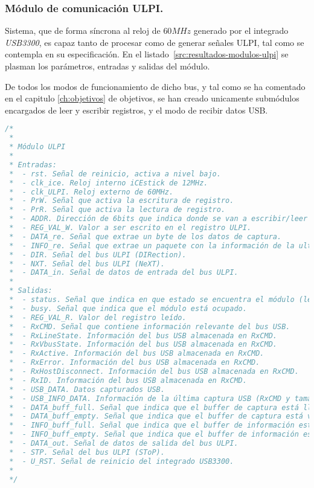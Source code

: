 \subsubsection{Módulo de comunicación ULPI.}
Sistema, que de forma síncrona al reloj de $60MHz$ generado por el integrado \emph{USB3300}, es capaz tanto de procesar como de generar señales ULPI, tal como se contempla en su especificación\cite{ulpi-specs}. En el listado~\ref{src:resultados-modulos-ulpi} se plasman los parámetros, entradas y salidas del módulo.

De todos los modos de funcionamiento de dicho bus, y tal como se ha comentado en el capitulo \ref{ch:objetivos} de objetivos, se han creado unicamente submódulos encargados de leer y escribir registros, y el modo de recibir datos USB.

\begin{lstlisting}[language=Verilog,
    caption={Entradas y salidas del módulo ULPI.},
    label=src:resultados-modulos-ulpi]
/*
 *
 * Módulo ULPI
 *
 * Entradas:
 *  - rst. Señal de reinicio, activa a nivel bajo.
 *  - clk_ice. Reloj interno iCEstick de 12MHz.
 *  - clk_ULPI. Reloj externo de 60MHz.
 *  - PrW. Señal que activa la escritura de registro.
 *  - PrR. Señal que activa la lectura de registro.
 *  - ADDR. Dirección de 6bits que indica donde se van a escribir/leer los datos.
 *  - REG_VAL_W. Valor a ser escrito en el registro ULPI.
 *  - DATA_re. Señal que extrae un byte de los datos de captura.
 *  - INFO_re. Señal que extrae un paquete con la información de la ultima captura.
 *  - DIR. Señal del bus ULPI (DIRection).
 *  - NXT. Señal del bus ULPI (NeXT).
 *  - DATA_in. Señal de datos de entrada del bus ULPI.
 *
 * Salidas:
 *  - status. Señal que indica en que estado se encuentra el módulo (lectura, escritura, etc..)
 *  - busy. Señal que indica que el módulo está ocupado.
 *  - REG_VAL_R. Valor del registro leído.
 *  - RxCMD. Señal que contiene información relevante del bus USB.
 *  - RxLineState. Información del bus USB almacenada en RxCMD.
 *  - RxVbusState. Información del bus USB almacenada en RxCMD.
 *  - RxActive. Información del bus USB almacenada en RxCMD.
 *  - RxError. Información del bus USB almacenada en RxCMD.
 *  - RxHostDisconnect. Información del bus USB almacenada en RxCMD.
 *  - RxID. Información del bus USB almacenada en RxCMD.
 *  - USB_DATA. Datos capturados USB.
 *  - USB_INFO_DATA. Información de la última captura USB (RxCMD y tamaño).
 *  - DATA_buff_full. Señal que indica que el buffer de captura está lleno.
 *  - DATA_buff_empty. Señal que indica que el buffer de captura está vacio.
 *  - INFO_buff_full. Señal que indica que el buffer de información está lleno.
 *  - INFO_buff_empty. Señal que indica que el buffer de información está vacio.
 *  - DATA_out. Señal de datos de salida del bus ULPI.
 *  - STP. Señal del bus ULPI (SToP).
 *  - U_RST. Señal de reinicio del integrado USB3300.
 *
 */
\end{lstlisting}


